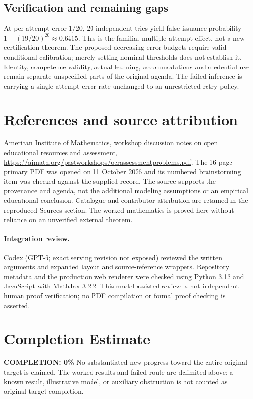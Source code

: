\documentclass[11pt]{article}
\begin{document}
\subsection{Verification and remaining gaps}
At per-attempt error $1/20$, 20 independent tries yield false issuance probability $1-(19/20)^{20}\approx0.6415$. This is the familiar multiple-attempt effect, not a new certification theorem. The proposed decreasing error budgets require valid conditional calibration; merely setting nominal thresholds does not establish it. Identity, competence validity, actual learning, accommodations and credential use remain separate unspecified parts of the original agenda. The failed inference is carrying a single-attempt error rate unchanged to an unrestricted retry policy.

\section{References and source attribution}
American Institute of Mathematics, workshop discussion notes on open educational resources and assessment, \url{https://aimath.org/pastworkshops/oerassessmentproblems.pdf}. The 16-page primary PDF was opened on 11 October 2026 and its numbered brainstorming item was checked against the supplied record. The source supports the provenance and agenda, not the additional modeling assumptions or an empirical educational conclusion. Catalogue and contributor attribution are retained in the reproduced Sources section. The worked mathematics is proved here without reliance on an unverified external theorem.


\paragraph{Integration review.} Codex (GPT-6; exact serving revision not exposed) reviewed the written arguments and expanded layout and source-reference wrappers. Repository metadata and the production web renderer were checked using Python 3.13 and JavaScript with MathJax 3.2.2. This model-assisted review is not independent human proof verification; no PDF compilation or formal proof checking is asserted.

\section{Completion Estimate}
\noindent\textbf{COMPLETION: 0\%}
No substantiated new progress toward the entire original target is claimed. The worked results and failed route are delimited above; a known result, illustrative model, or auxiliary obstruction is not counted as original-target completion.
\end{document}
